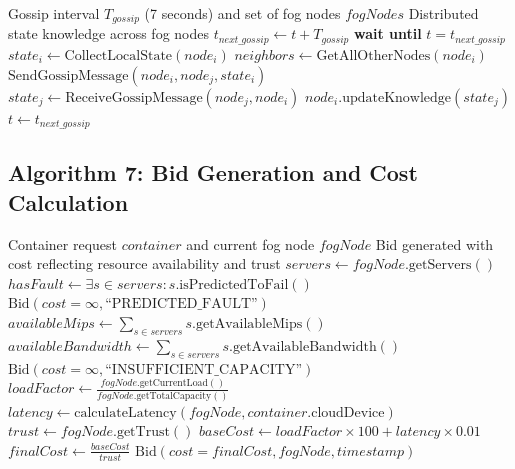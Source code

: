 \documentclass[12pt,a4paper]{article}
\begin{document}
\begin{algorithm}[H]
\caption{Gossip-Based State Synchronization}
\begin{algorithmic}[1]
\Require Gossip interval $T_{gossip}$ (7 seconds) and set of fog nodes $fogNodes$
\Ensure Distributed state knowledge across fog nodes
    \State $t_{next\_gossip} \gets t + T_{gossip}$
    \State \textbf{wait until} $t = t_{next\_gossip}$
        \State $state_i \gets \text{CollectLocalState}(node_i)$ 
        \State $neighbors \gets \text{GetAllOtherNodes}(node_i)$
            \State $\text{SendGossipMessage}(node_i, node_j, state_i)$
            \State $state_j \gets \text{ReceiveGossipMessage}(node_j, node_i)$
            \State $node_i.\text{updateKnowledge}(state_j)$ 
        \EndFor
    \EndFor
    \State $t \gets t_{next\_gossip}$
\EndWhile
\end{algorithmic}
\end{algorithm}

\subsection{Algorithm 7: Bid Generation and Cost Calculation}

\begin{algorithm}[H]
\caption{Generate Bid for Container Placement}
\begin{algorithmic}[1]
\Require Container request $container$ and current fog node $fogNode$
\Ensure Bid generated with cost reflecting resource availability and trust
\State $servers \gets fogNode.\text{getServers}()$
\State $hasFault \gets \exists s \in servers : s.\text{isPredictedToFail}()$
    \State \Return $\text{Bid}(cost = \infty, \text{``PREDICTED\_FAULT''})$ 
\EndIf
\State $availableMips \gets \sum_{s \in servers} s.\text{getAvailableMips}()$
\State $availableBandwidth \gets \sum_{s \in servers} s.\text{getAvailableBandwidth}()$
    \State \Return $\text{Bid}(cost = \infty, \text{``INSUFFICIENT\_CAPACITY''})$
\EndIf
\State $loadFactor \gets \frac{fogNode.\text{getCurrentLoad}()}{fogNode.\text{getTotalCapacity}()}$
\State $latency \gets \text{calculateLatency}(fogNode, container.\text{cloudDevice})$
\State $trust \gets fogNode.\text{getTrust}()$ 
\State $baseCost \gets loadFactor \times 100 + latency \times 0.01$
\State $finalCost \gets \frac{baseCost}{trust}$ 
\State \Return $\text{Bid}(cost = finalCost, fogNode, timestamp)$
\end{algorithmic}
\end{algorithm}
\end{document}
